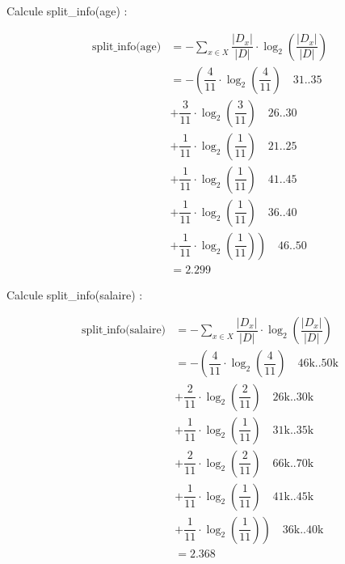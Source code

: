 \documentclass{article}
\begin{document}
\vspace{1.15cm}

Calcule split\_info(age) :


\begin{align*}
    \text{split\_info(age)} &= - \sum_{x \in X} \dfrac{|D_x|}{|D|} \cdot \log_2\left( \dfrac{|D_x|}{|D|} \right) \\[0.25cm]
                            &= - \left( \dfrac{4}{11} \cdot  \log_2\left( \dfrac{4}{11} \right) \quad \text{31..35} \right. \\[0.25cm]
                            &+ \dfrac{3}{11} \cdot  \log_2\left( \dfrac{3}{11} \right) \quad \text{26..30} \\[0.25cm]
                            &+ \dfrac{1}{11} \cdot  \log_2\left( \dfrac{1}{11} \right) \quad \text{21..25} \\[0.25cm]
                            &+ \dfrac{1}{11} \cdot  \log_2\left( \dfrac{1}{11} \right) \quad \text{41..45} \\[0.25cm]
                            &+ \dfrac{1}{11} \cdot  \log_2\left( \dfrac{1}{11} \right) \quad \text{36..40} \\[0.25cm]
                            &+ \left. \dfrac{1}{11} \cdot  \log_2\left( \dfrac{1}{11} \right)\right) \quad \text{46..50}  \\[0.25cm]
                            & = 2.299
\end{align*}


\newpage

Calcule split\_info(salaire) :


\begin{align*}
    \text{split\_info(salaire)} &= - \sum_{x \in X} \dfrac{|D_x|}{|D|} \cdot \log_2\left( \dfrac{|D_x|}{|D|} \right) \\[0.25cm]
                            &= - \left( \dfrac{4}{11} \cdot  \log_2\left( \dfrac{4}{11} \right) \quad \text{46k..50k} \right. \\[0.25cm]
                            &+ \dfrac{2}{11} \cdot  \log_2\left( \dfrac{2}{11} \right) \quad \text{26k..30k} \\[0.25cm]
                            &+ \dfrac{1}{11} \cdot  \log_2\left( \dfrac{1}{11} \right) \quad \text{31k..35k} \\[0.25cm]
                            &+ \dfrac{2}{11} \cdot  \log_2\left( \dfrac{2}{11} \right) \quad \text{66k..70k} \\[0.25cm]
                            &+ \dfrac{1}{11} \cdot  \log_2\left( \dfrac{1}{11} \right) \quad \text{41k..45k} \\[0.25cm]
                            &+ \left. \dfrac{1}{11} \cdot  \log_2\left( \dfrac{1}{11} \right)\right) \quad \text{36k..40k}  \\[0.25cm]
                            & = 2.368
\end{align*}
\end{document}
